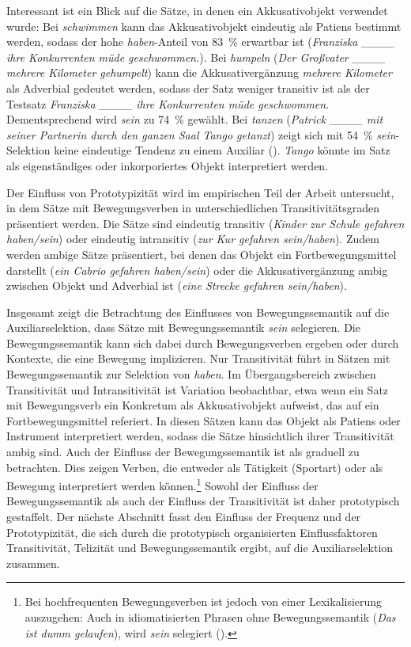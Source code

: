  Interessant ist ein Blick auf die Sätze, in denen ein Akkusativobjekt verwendet wurde: Bei \textit{schwimmen} kann das Akkusativobjekt eindeutig als Patiens bestimmt werden, sodass der hohe \textit{haben}-Anteil von 83~\% erwartbar ist (\textit{Franziska  \_\_\_\_ ihre Konkurrenten müde geschwommen.}). Bei \textit{humpeln} (\textit{Der Großvater \_\_\_\_ mehrere Kilometer gehumpelt}) kann die Akkusativergänzung \textit{mehrere Kilometer} als Adverbial gedeutet werden, sodass der Satz weniger transitiv ist als der Testsatz \textit{Franziska  \_\_\_\_ ihre Konkurrenten müde geschwommen}. Dementsprechend wird \textit{sein} zu 74~\% gewählt. Bei \textit{tanzen} (\textit{Patrick  \_\_\_\_ mit seiner Partnerin durch den ganzen Saal Tango getanzt}) zeigt sich mit 54~\% \textit{sein}-Selektion keine eindeutige Tendenz zu einem Auxiliar (\cite[112--113]{Hinze.2007}). \textit{Tango} könnte im Satz als eigenständiges oder inkorporiertes Objekt interpretiert werden. 


Der Einfluss von Prototypizität wird im empirischen Teil der Arbeit untersucht, in dem Sätze mit Bewegungsverben in unterschiedlichen Transitivitätsgraden präsentiert werden. Die Sätze sind eindeutig transitiv (\textit{Kinder zur Schule gefahren haben/sein}) oder eindeutig intransitiv (\textit{zur Kur gefahren sein/haben}). Zudem werden ambige Sätze präsentiert, bei denen das Objekt ein Fortbewegungsmittel darstellt (\textit{ein Cabrio gefahren haben/sein}) oder die Akkusativergänzung ambig zwischen Objekt und Adverbial ist (\textit{eine Strecke gefahren sein/haben}).

Insgesamt zeigt die Betrachtung des Einflusses von Bewegungssemantik auf die Auxiliar\-selektion, dass Sätze mit Bewegungssemantik \textit{sein} selegieren. Die Bewegungssemantik kann sich dabei durch Bewegungsverben ergeben oder durch Kontexte, die eine Bewegung implizieren. Nur Transitivität führt in Sätzen mit Bewegungssemantik zur Selektion von \textit{haben}. Im Übergangsbereich zwischen Transitivität und Intransitivität ist Variation beobachtbar, etwa wenn ein Satz mit Bewegungsverb ein Konkretum als Akkusativobjekt aufweist, das auf ein Fortbewegungsmittel referiert. In diesen Sätzen kann das Objekt als Patiens oder Instrument interpretiert werden, sodass die Sätze hinsichtlich ihrer Transitivität ambig sind. Auch der Einfluss der Bewegungssemantik ist als graduell zu betrachten. Dies zeigen Verben, die entweder als Tätigkeit (Sportart) oder als Bewegung interpretiert werden können.\footnote{Bei hochfrequenten Bewegungsverben ist jedoch von einer Lexikalisierung auszugehen: Auch in idiomatisierten Phrasen ohne Bewegungssemantik (\textit{Das ist dumm gelaufen}), wird \textit{sein} selegiert (\cite[303]{Gillmann.2016}).} Sowohl der Einfluss der Bewegungssemantik als auch der Einfluss der Transitivität ist daher prototypisch gestaffelt. Der nächste Abschnitt fasst den Einfluss der Frequenz und der Prototypizität, die sich durch die prototypisch organisierten Einflussfaktoren Transitivität, Telizität und Bewegungssemantik ergibt, auf die Auxiliarselektion zusammen.


